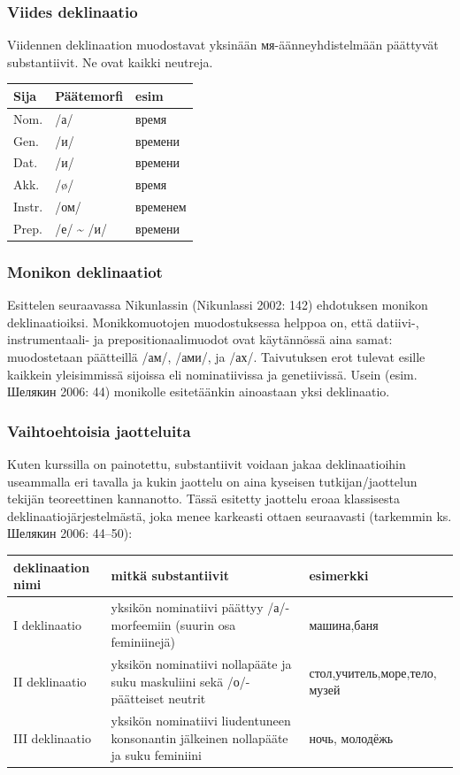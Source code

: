 \documentclass[]{scrartcl}
\begin{document}
\subsubsection{Viides deklinaatio}\label{viides-deklinaatio}

Viidennen deklinaation muodostavat yksinään мя-äänneyhdistelmään
päättyvät substantiivit. Ne ovat kaikki neutreja.

\begin{longtable}[c]{@{}lll@{}}
\toprule
Sija & Päätemorfi & esim\tabularnewline
\midrule
\endhead
Nom. & /а/ & время\tabularnewline
Gen. & /и/ & времени\tabularnewline
Dat. & /и/ & времени\tabularnewline
Akk. & /ø/ & время\tabularnewline
Instr. & /ом/ & временем\tabularnewline
Prep. & /е/ \textasciitilde{} /и/ & времени\tabularnewline
\bottomrule
\end{longtable}

\subsubsection{Monikon deklinaatiot}\label{monikon-deklinaatiot}

Esittelen seuraavassa Nikunlassin (Nikunlassi 2002: 142) ehdotuksen
monikon deklinaatioiksi. Monikkomuotojen muodostuksessa helppoa on, että
datiivi-, instrumentaali- ja prepositionaalimuodot ovat käytännössä aina
samat: muodostetaan päätteillä /ам/, /ами/, ja /ах/. Taivutuksen erot
tulevat esille kaikkein yleisimmissä sijoissa eli nominatiivissa ja
genetiivissä. Usein (esim. Шелякин 2006: 44) monikolle esitetäänkin
ainoastaan yksi deklinaatio.

\subsubsection{Vaihtoehtoisia
jaotteluita}\label{vaihtoehtoisia-jaotteluita}

Kuten kurssilla on painotettu, substantiivit voidaan jakaa
deklinaatioihin useammalla eri tavalla ja kukin jaottelu on aina
kyseisen tutkijan/jaottelun tekijän teoreettinen kannanotto. Tässä
esitetty jaottelu eroaa klassisesta deklinaatiojärjestelmästä, joka
menee karkeasti ottaen seuraavasti (tarkemmin ks. Шелякин 2006: 44--50):

\begin{longtable}[c]{@{}lll@{}}
\toprule
deklinaation nimi & mitkä substantiivit & esimerkki\tabularnewline
\midrule
\endhead
I deklinaatio & yksikön nominatiivi päättyy /а/-morfeemiin (suurin osa
feminiinejä) & машина,баня\tabularnewline
II deklinaatio & yksikön nominatiivi nollapääte ja suku maskuliini sekä
/о/-päätteiset neutrit & стол,учитель,море,тело, музей\tabularnewline
III deklinaatio & yksikön nominatiivi liudentuneen konsonantin jälkeinen
nollapääte ja suku feminiini & ночь, молодёжь\tabularnewline
\bottomrule
\end{longtable}
\end{document}
